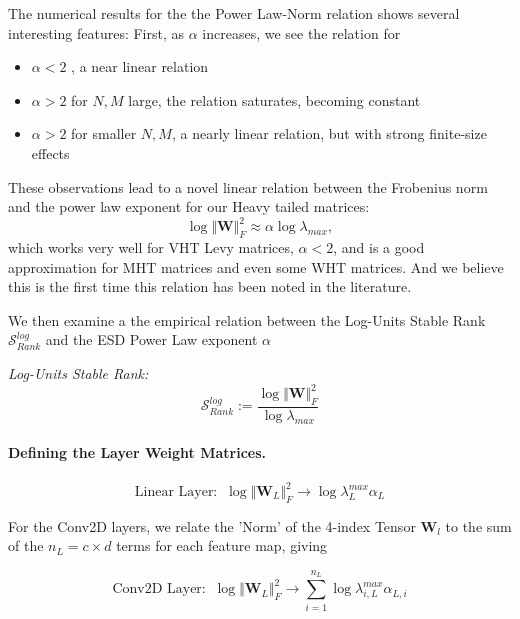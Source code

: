 The numerical results for the the Power Law-Norm relation shows several interesting features: 
First, as $\alpha$ increases, we see the relation for
\begin{itemize}
\item  $\alpha<2$ , a near linear relation 
\item  $\alpha>2$ for $N,M$ large, the relation saturates, becoming constant
\item  $\alpha>2$  for smaller $N,M$,  a nearly linear relation, but with strong finite-size effects
\end{itemize}
These observations lead to a novel linear relation between the Frobenius norm and the power law exponent for our Heavy tailed matrices:
$$
\log\Vert\mathbf{W}\Vert^{2}_{F}\approx\alpha\log\lambda_{max}  ,
$$
which works very well for VHT Levy matrices, $\alpha<2$, and is a good approximation for MHT matrices and even some WHT matrices. 
And we believe this is the first time this relation has been noted in the literature.


We then examine a the empirical relation between  the Log-Units Stable Rank 
$\mathcal{S}^{log}_{Rank}$ and the ESD Power Law exponent $\alpha$

\emph{Log-Units Stable Rank:  } 
$$\mathcal{S}^{log}_{Rank}:=\dfrac{\log\Vert\mathbf{W}\Vert^{2}_{F}}{\log\lambda_{max}}$$



\paragraph{Defining the Layer Weight Matrices.} 


$$\text{Linear Layer:}\;\;\log\Vert\mathbf{W}_{L}\Vert^{2}_{F}\rightarrow\log\lambda^{max}_{L}\alpha_{L}$$

For the Conv2D layers, we relate the 'Norm' of the 4-index Tensor $\mathbf{W}_{l}$ to the sum of the $n_{L}=c\times d$ terms for each feature map, giving 

$$\text{Conv2D Layer:}\;\;\log\Vert\mathbf{W}_{L}\Vert^{2}_{F}\rightarrow \sum_{i=1}^{n_{L}}\log\lambda^{max}_{i,L}\alpha_{L,i}$$

